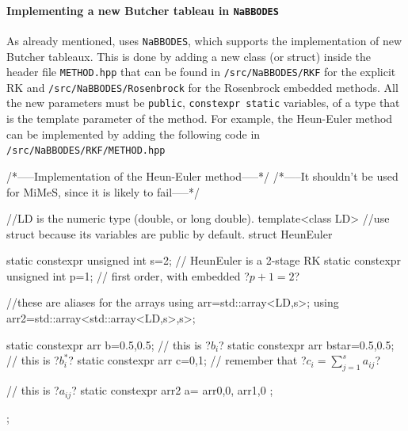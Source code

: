 \documentclass[11pt,a4paper]{article}
\begin{document}
\paragraph{Implementing a new Butcher tableau in {\tt NaBBODES}} As already mentioned, \mimes uses {\tt NaBBODES}, which supports the implementation of new Butcher tableaux. This is done by adding a new class (or struct) inside the header file {\tt METHOD.hpp} that can be found in {\tt \mimes/src/NaBBODES/RKF} for the explicit RK and  {\tt \mimes/src/NaBBODES/Rosenbrock} for the Rosenbrock embedded methods. All the new parameters must be {\tt public},  {\tt constexpr static} variables, of a type that is the template parameter of the method. For example, the Heun-Euler method can be implemented by adding the following code in  {\tt \mimes/src/NaBBODES/RKF/METHOD.hpp}
%
\begin{cpp}
	/*-----Implementation of the Heun-Euler method-----*/
	/*-----It shouldn't be used for MiMeS, since it is likely to fail-----*/
	
	//LD is the numeric type (\ie double, or long double).
	template<class LD>
	//use struct because its variables are public by default.
	struct HeunEuler{  
		static constexpr unsigned int s=2; // HeunEuler is a 2-stage RK
		static constexpr unsigned int p=1; // first order, with embedded ?$p+1=2$?

		//these are aliases for the arrays
		using arr=std::array<LD,s>;
		using arr2=std::array<std::array<LD,s>,s>;
		
		static constexpr arr b={0.5,0.5}; // this is ?$b_i$?
		static constexpr arr bstar={0.5,0.5}; // this is ?$b_i^{*}$?
		static constexpr arr c={0,1}; // remember that ?$c_i = \displaystyle\sum_{j=1}^{s} a_{ij}$?
		
		// this is ?$a_{ij}$?
		static constexpr arr2 a={
			arr{0,0},
			arr{1,0}
		};			
	};
\end{cpp}
\end{document}
